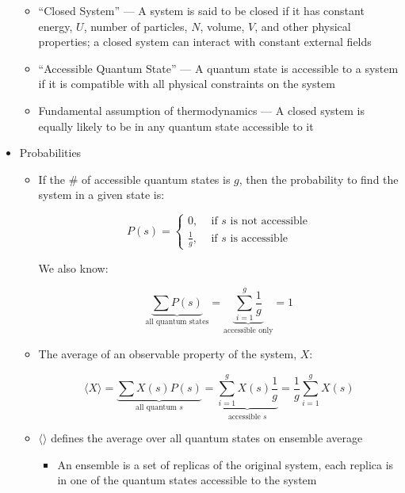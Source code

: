 \begin{itemize}
    \begin{itemize}

      \item ``Closed System'' — A system is said to be closed if it has constant energy, $U$, number of particles, $N$, volume, $V$, and other physical properties; a closed system can interact with constant external fields

      \item ``Accessible Quantum State'' — A quantum state is accessible to a system if it is compatible with all physical constraints on the system

      \item Fundamental assumption of thermodynamics — A closed system is equally likely to be in any quantum state accessible to it

    \end{itemize}

  \item Probabilities

    \begin{itemize}

      \item If the \# of accessible quantum states is $g$, then the probability to find the system in a given state is:

        $$P(s)=\left\{\begin{array}{l} 0,\,\quad\text{if $s$ is not accessible}\\\displaystyle\frac{1}{g},\,\quad\text{if $s$ is accessible}\end{array}$$

          We also know:

          $$\underbrace{\sum P(s)}_{\text{all quantum states}}=\underbrace{\sum_{i=1}^g\frac{1}{g}}_{\text{accessible only}}=1$$

        \item The average of an observable property of the system, $X$:

          $$\langle X\rangle=\underbrace{\sum X(s)P(s)}_{\text{all quantum $s$}}=\underbrace{\sum_{i=1}^g X(s)\frac{1}{g}}_{\text{accessible $s$}}=\frac{1}{g}\sum_{i=1}^g X(s)$$

        \item $\langle\rangle$ defines the average over all quantum states on ensemble average

          \begin{itemize}

            \item An ensemble is a set of replicas of the original system, each replica is in one of the quantum states accessible to the system


\end{itemize}
\end{itemize}
\end{itemize}
